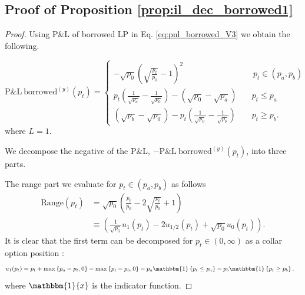 \documentclass[pdftex,11pt,a4paper] {article}
\begin{document}
\subsection{Proof of Proposition \protect\ref{prop:il_dec_borrowed1}}

\label{ap_prop:il_dec_borrowed1}
\begin{proof}

Using P\&L of borrowed LP in Eq. \eqref{eq:pnl_borrowed_V3} we obtain the following.

\begin{equation} \label{eq:mdp1}
\mathrm{P\&L\ borrowed}^{(y)}(p_{t}) =  \begin{cases}
  -\sqrt{p_{0}} \left(\sqrt{\frac{p_{t}}{p_{0}}}-1\right)^{2}
\quad & \, p_{t} \in (p_{a}, p_{b}) \\
 p_{t} \left(\frac{1}{\sqrt{p_{a}}} - \frac{1}{\sqrt{p_{0}}}\right) -\left(\sqrt{p_{0}} - \sqrt{p_{a}}\right)  \quad & p_{t} \leq p_{a} \\
 \left(\sqrt{p_{b}} - \sqrt{p_{0}}\right) -p_{t} \left(\frac{1}{\sqrt{p_{0}}} - \frac{1}{\sqrt{p_{b}}}\right) \quad & p_{t}  \geq  p_{b}.
\end{cases}
\end{equation}
where $L=1$.

We decompose the negative of the P\&L, $-\mathrm{P\&L\ borrowed}^{(y)}(p_{t})$, into three parts.


The range part we evaluate for $p_{t} \in (p_{a}, p_{b}) $ as follows
\begin{equation} \label{eq:rp1}
\begin{split}
\mathrm{Range}(p_{t}) & =  \sqrt{p_{0}} \left(\frac{p_{t}}{p_{0}} -2\sqrt{\frac{p_{t}}{p_{0}}}+1\right)\\
& \equiv    \left(\frac{1}{\sqrt{p_{0}}}u_{1}(p_{t}) -  2u_{1/2}(p_{t})+\sqrt{p_{0}} u_{0}(p_{t}) \right).
\end{split}
\end{equation}
It is clear that the first term can be decomposed for $p_{t}\in(0, \infty)$ as a collar option position :
\begin{equation} \label{eq:rp1a}
\begin{split}
u_{1}(p_{t}) & =  p_{t} + \max\left\{ p_{a}-p_{t}, 0\right\} - \max\left\{ p_{t}-p_{b}, 0\right\} - p_{a}\mathbbm{1}\left\{p_{t}\leq p_{a}\right\} - p_{b}\mathbbm{1}\left\{p_{t} \geq p_{b}\right\}.
\end{split}
\end{equation}
where $\mathbbm{1}\{x\}$ is the indicator function.


\end{proof}
\end{document}

